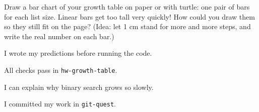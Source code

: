 \begin{creative}
Draw a bar chart of your growth table on paper or with turtle: one pair of bars for each list size. Linear bars get too tall very quickly! How could you draw them so they still fit on the page? (Idea: let 1 cm stand for more and more steps, and write the real number on each bar.)
\answerspace{3.5cm}
\end{creative}

\begin{selfcheck}
  \item I wrote my predictions before running the code.
  \item All checks pass in \texttt{hw-growth-table}.
  \item I can explain why binary search grows so slowly.
  \item I committed my work in \texttt{git-quest}.
\end{selfcheck}
